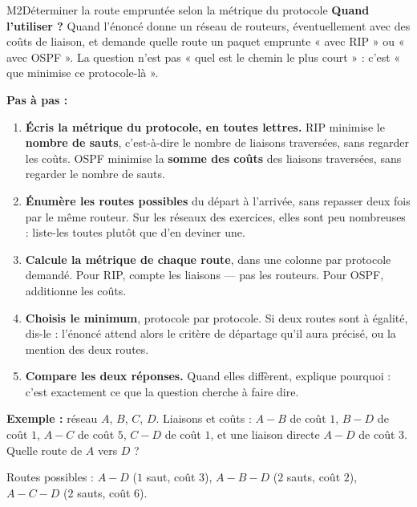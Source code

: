 \begin{fichemethode}{M2}{Déterminer la route empruntée selon la métrique du protocole}
\textbf{Quand l'utiliser ?} Quand l'énoncé donne un réseau de routeurs, éventuellement avec des
coûts de liaison, et demande quelle route un paquet emprunte « avec RIP » ou « avec OSPF ». La
question n'est pas « quel est le chemin le plus court » : c'est « que minimise ce
protocole-là ».

\textbf{Pas à pas :}
\begin{enumerate}
  \item \textbf{Écris la métrique du protocole, en toutes lettres.} RIP minimise le
    \textbf{nombre de sauts}, c'est-à-dire le nombre de liaisons traversées, sans regarder les
    coûts. OSPF minimise la \textbf{somme des coûts} des liaisons traversées, sans regarder le
    nombre de sauts.
  \item \textbf{Énumère les routes possibles} du départ à l'arrivée, sans repasser deux fois
    par le même routeur. Sur les réseaux des exercices, elles sont peu nombreuses : liste-les
    toutes plutôt que d'en deviner une.
  \item \textbf{Calcule la métrique de chaque route}, dans une colonne par protocole demandé.
    Pour RIP, compte les liaisons — pas les routeurs. Pour OSPF, additionne les coûts.
  \item \textbf{Choisis le minimum}, protocole par protocole. Si deux routes sont à égalité,
    dis-le : l'énoncé attend alors le critère de départage qu'il aura précisé, ou la mention
    des deux routes.
  \item \textbf{Compare les deux réponses.} Quand elles diffèrent, explique pourquoi : c'est
    exactement ce que la question cherche à faire dire.
\end{enumerate}

\textbf{Exemple :} réseau $A$, $B$, $C$, $D$. Liaisons et coûts : $A\!-\!B$ de coût $1$,
$B\!-\!D$ de coût $1$, $A\!-\!C$ de coût $5$, $C\!-\!D$ de coût $1$, et une liaison directe
$A\!-\!D$ de coût $3$. Quelle route de $A$ vers $D$ ?

Routes possibles : $A\!-\!D$ ($1$ saut, coût $3$), $A\!-\!B\!-\!D$ ($2$ sauts, coût $2$),
$A\!-\!C\!-\!D$ ($2$ sauts, coût $6$).


\end{fichemethode}
